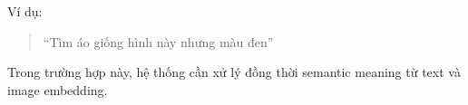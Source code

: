 Ví dụ:
\begin{quote}
“Tìm áo giống hình này nhưng màu đen”
\end{quote}

Trong trường hợp này, hệ thống cần xử lý đồng thời semantic meaning từ text và image embedding.





